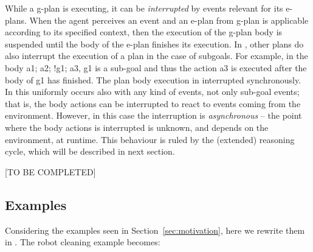 %
%
%


While a g-plan is executing, it can be \emph{interrupted} by events
relevant for its e-plans. When the agent perceives an event and an
e-plan from g-plan is applicable according to its specified context,
then the execution of the g-plan body is suspended until the body of
the e-plan finishes its execution.
%
In {\asl}, other plans do also interrupt the execution of a plan in
the case of subgoals. For example, in the body \textsf{a1; a2; !g1;
  a3}, \textsf{g1} is a sub-goal and thus the action \textsf{a3} is
executed after the body of \textsf{g1} has finished. The plan body
execution in interrupted synchronously.
%
In {\aser} this uniformly occurs also with any kind of events, not
only sub-goal events; that is, the body actions can be interrupted to
react to events coming from the environment. However, in this case the
interruption is \emph{asynchronous} -- the point where the body
actions is interrupted is unknown, and depends on the environment, at
runtime.
%
This behaviour is ruled by the (extended) reasoning cycle, which will
be described in next section.


[TO BE COMPLETED]

\subsection{Examples}

Considering the examples seen in Section~\ref{sec:motivation}, here we rewrite them in {\aser}. 
%
The robot cleaning example becomes:

